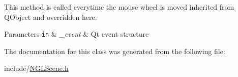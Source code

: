 This method is called everytime the mouse wheel is moved inherited from Q\+Object and overridden here. 


\begin{DoxyParams}[1]{Parameters}
\mbox{\tt in}  & {\em \+\_\+event} & Qt event structure \\
\hline
\end{DoxyParams}


The documentation for this class was generated from the following file\+:\begin{DoxyCompactItemize}
\item 
include/\hyperlink{_n_g_l_scene_8h}{N\+G\+L\+Scene.\+h}\end{DoxyCompactItemize}
